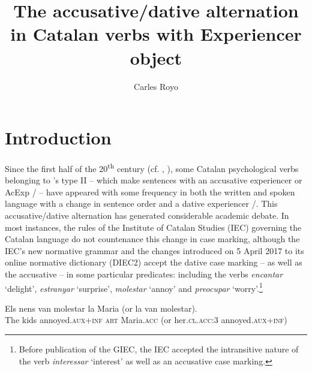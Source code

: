 \documentclass[output=paper,colorlinks,citecolor=brown,nonflat]{./langscibook}
\author{Carles Royo\affiliation{Universitat Rovira i Virgili}}
\title{The accusative/dative alternation in Catalan verbs with Experiencer object}
\begin{document}
\maketitle 


\section{Introduction}\label{sec:royo:1}

Since the first half of the 20\textsuperscript{th} century (cf. \citealt[16]{Ginebra2003}, \citealt[147]{Ginebra2015}), some Catalan psychological verbs belonging to \citet{BellettiRizzi1988}'s type II – which make sentences with an accusative experiencer or AcExp / – have appeared with some frequency in both the written and spoken language with a change in sentence order and a dative experiencer /. This accusative/dative alternation has generated considerable academic debate. In most instances, the rules of the Institute of Catalan Studies (IEC) governing the Catalan language do not countenance this change in case marking, although the IEC’s new normative grammar \citep{GIEC2016} and the changes introduced on 5 April 2017 to its online normative dictionary (DIEC2) accept the dative case marking – as well as the accusative – in some particular predicates: including the verbs \textit{encantar} ‘delight’, \textit{estranyar} ‘surprise’, \textit{molestar} ‘annoy’ and \textit{preocupar} ‘worry’.\footnote{Before publication of the GIEC, the IEC accepted the intransitive nature of the verb \textit{interessar} ‘interest’ as well as an accusative case marking.}

\ea%
 \label{ex:royo:1}
 \ea \label{ex:royo:1a}
 \gll Els nens van molestar la Maria ({or} la van molestar).\\
 The kids annoyed.\textsc{aux+inf} \textsc{art} Maria.\textsc{acc} ({or} her.\textsc{cl.acc}:3 annoyed.\textsc{aux+inf}) \\
 \glt 
 
\end{document}
